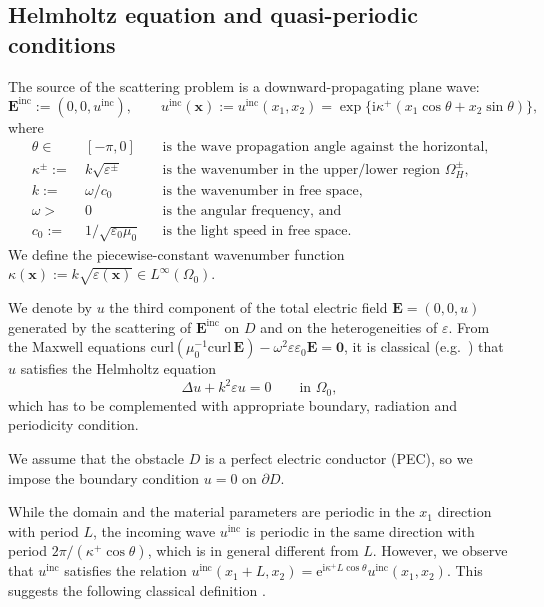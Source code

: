 \documentclass[a4paper,10pt]{article}
\newcommand{\bx}{{\mathbf x}}
\newcommand{\bE}{{\mathbf E}}
\newcommand{\ri}{{\mathrm i}}
\newcommand{\re}{{\mathrm e}}
\newcommand{\inc}{{\mathrm{inc}}}
\begin{document}
	\subsection{Helmholtz equation and quasi-periodic conditions}
	The source of the scattering problem is a downward-propagating plane wave:
	\begin{equation}\label{incident}
		\bE^\inc:=(0,0,u^\inc),\qquad
		u^\inc(\bx):=u^\inc(x_1,x_2)=\exp\{\ri\kappa^+(x_1 \cos \theta + x_2 \sin \theta)\},
	\end{equation} 
	where 
	\begin{align*}
		\theta \in \ & [-\pi, 0] && \text{is the wave propagation angle against the horizontal},\\
		\kappa^\pm:=\ &k\sqrt{\varepsilon^\pm} &&\text{is the wavenumber in the upper/lower region }\Omega_H^{\pm},\\
		k:=\ &\omega/c_0 &&\text{is the wavenumber in free space},\\
		\omega>\ &0 &&\text{is the angular frequency, and}\\
		c_0:=\ & 1/\sqrt{\varepsilon_0\mu_0} &&\text{is the light speed in free space.}
	\end{align*}
	We define the piecewise-constant wavenumber function $\kappa(\bx):=k\sqrt{\varepsilon(\bx)}\in L^\infty(\Omega_0)$. 
	
	We denote by $u$ the third component of the total electric field $\mathbf E=(0,0,u)$ generated by the scattering of $\bE^\inc$ on $D$ and on the heterogeneities of $\varepsilon$.
	From the Maxwell equations $\mathrm{curl}(\mu_0^{-1}\mathrm{curl}\,\bE)-\omega^2\varepsilon\varepsilon_0\bE=\mathbf0$, it is classical (e.g.\ \cite{BonnetBD1994,Civiletti2020}) that $u$ satisfies the Helmholtz equation 
	$$
	\Delta u+k^2\varepsilon u=0 \qquad \text{in }\Omega_0,
	$$
	which has to be complemented with appropriate boundary, radiation and periodicity condition.
	
	We assume that the obstacle $D$ is a perfect electric conductor (PEC), so we impose the boundary condition $u=0$ on $\partial D$.
	
	While the domain and the material parameters are periodic in the $x_1$ direction with period $L$, the incoming wave $u^\inc$ is periodic in the same direction with period $2\pi/(\kappa^+\cos\theta)$, which is in general different from $L$.
	However, we observe that $u^\inc$ satisfies the relation $u^\inc(x_1+L,x_2)=\re^{\ri\kappa^+L\cos\theta}u^\inc(x_1,x_2)$.
	This suggests the following classical definition \cite{Pinto2020}.
	
\end{document}
